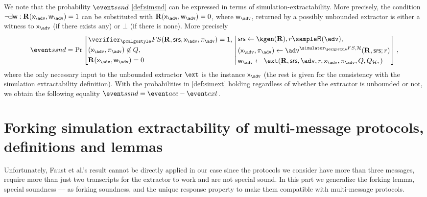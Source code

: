 \documentclass[runningheads,10pt]{llncs}
\begin{document}
  \label{rem:simext_to_simsnd}
  We note that the probability $\ssndProb$ \cref{def:simsnd} can be expressed in
  terms of simulation-extractability. More precisely, the
  condition $\neg \exists \wit: \REL(\inp_\adv, \wit_\adv) = 1$ can be substituted with
  $\REL(\inp_\adv, \wit_\adv) = 0$, where $\wit_\adv$, returned by a possibly unbounded
  extractor is either a witness to $\inp_\adv$ (if there exists any) or $\bot$ (if
  there is none). More precisely
\[
      \ssndProb =
      \Pr\left[
        \begin{aligned}
          & \verifier_\fs(\REL, \srs, \inp_{\adv}, \zkproof_{\adv}) = 1,\\
          & (\inp_{\advse}, \zkproof_{\advse}) \not\in Q,\\
          & \REL(\inp_{\adv}, \wit_{\adv}) = 0
        \end{aligned}
        \, \left| \,
      \begin{aligned}
        & \srs \gets \kgen(\REL), r \sample \RND{\advse},\\
        & (\inp_{\advse}, \zkproof_{\advse}) \gets \advse^{\simulator_\fs,
          \ro} (\REL, \srs; r)\\
        & \wit_{\adv} \gets \ext(\REL, \srs, \advse, r, \inp_{\advse}, \zkproof_{\advse},
			Q, Q_\ro,) 
      \end{aligned}
		\right.  \right],
\]
where the only necessary input to the unbounded extractor $\ext$ is the instance
$\inp_\adv$ (the rest is given for the consistency with the simulation extractability
definition). 
%
With the probabilities in \cref{def:simext} holding regardless of whether the extractor
is unbounded or not, we obtain the following equality
$ \ssndProb = \accProb - \extProb$.


\section{Forking simulation extractability of multi-message protocols,
  definitions and lemmas}
\label{sec:se_definitions}
Unfortunately, Faust et al.'s result cannot be directly applied in our case
since the protocols we consider have more than three messages, require more than
just two transcripts for the extractor to work and are not special
sound. In this part we generalize the forking lemma, special
soundness --- as forking soundness, and the unique response property to make them compatible with
multi-message protocols.
\end{document}
